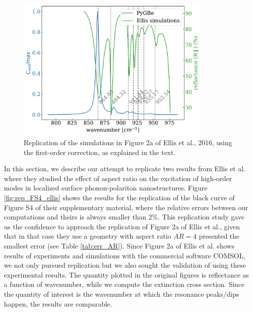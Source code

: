 \begin{figure}
    \centering
    \includegraphics[width=0.85\textwidth]{replication_FOA_fig2a_Ellis.pdf} 
    \caption{Replication of the simulations in Figure 2a of Ellis et al., 2016, using the first-order correction, as explained in the text.}
    \label{fig:rep_2a}
 \end{figure}


In this section, we describe our attempt to replicate two results from Ellis et al. \cite{ellis2016} where they studied the effect of aspect ratio on the 
excitation of high-order modes in localized surface phonon-polariton nanostructures. Figure \ref{fig:rep_FS4_ellis} shows the results for
the replication of the black curve of Figure S4 of their supplementary material, where the relative errors between our computations and 
theirs is always smaller than 2$\%$. This replication study gave us the confidence to approach the replication of Figure 2a of Ellis et al., 
given that in that case they use a geometry with aspect ratio $AR=4$ presented the smallest error (see Table \ref{tab:err_AR}). Since 
Figure 2a of Ellis et al. shows results of experiments and simulations with the commercial software COMSOL, we not only pursued replication 
but we also sought the validation of \pygbe using these experimental results. The quantity plotted in the original figures is reflectance as a 
function of wavenumber, while we compute the extinction cross section. Since the quantity of interest is the wavenumber at which the resonance 
peaks/dips happen, the results are comparable. 

